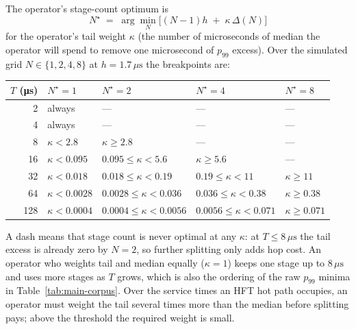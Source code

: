 \documentclass[11pt]{article}
\begin{document}
The operator's stage-count optimum is
\[
N^\star \;=\; \arg\min_N \Big[ (N-1) h \;+\; \kappa \, \Delta(N) \Big]
\]
for the operator's tail weight $\kappa$ (the number of microseconds of median the operator
will spend to remove one microsecond of $p_{99}$ excess). Over the simulated grid $N \in
\{1, 2, 4, 8\}$ at $h = 1.7\,\mu\mathrm{s}$ the breakpoints are:
\begin{center}
\begin{tabular}{@{}r llll@{}}
\toprule
$T$ (\si{\micro\second}) & $N^\star = 1$ & $N^\star = 2$ & $N^\star = 4$ & $N^\star = 8$ \\
\midrule
  2 & always             & ---                        & ---                        & ---                 \\
  4 & always             & ---                        & ---                        & ---                 \\
  8 & $\kappa < 2.8$     & $\kappa \ge 2.8$           & ---                        & ---                 \\
 16 & $\kappa < 0.095$   & $0.095 \le \kappa < 5.6$   & $\kappa \ge 5.6$           & ---                 \\
 32 & $\kappa < 0.018$   & $0.018 \le \kappa < 0.19$  & $0.19 \le \kappa < 11$     & $\kappa \ge 11$     \\
 64 & $\kappa < 0.0028$  & $0.0028 \le \kappa < 0.036$& $0.036 \le \kappa < 0.38$  & $\kappa \ge 0.38$   \\
128 & $\kappa < 0.0004$  & $0.0004 \le \kappa < 0.0056$& $0.0056 \le \kappa < 0.071$& $\kappa \ge 0.071$ \\
\bottomrule
\end{tabular}
\end{center}
A dash means that stage count is never optimal at any $\kappa$: at $T \le 8\,\mu\mathrm{s}$
the tail excess is already zero by $N = 2$, so further splitting only adds hop cost. An
operator who weights tail and median equally ($\kappa = 1$) keeps one stage up to
$8\,\mu\mathrm{s}$ and uses more stages as $T$ grows, which is also the ordering of the raw
$p_{99}$ minima in Table~\ref{tab:main-corpus}. Over the service times an HFT hot path
occupies, an operator must weight the tail several times more than the median before
splitting pays; above the threshold the required weight is small.
\end{document}
